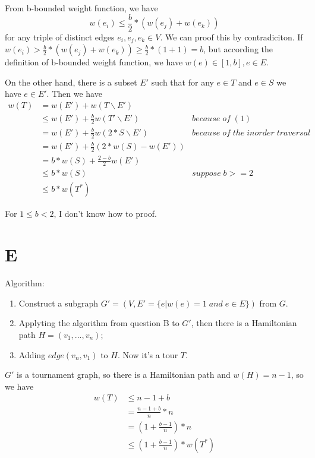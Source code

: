\documentclass{article}
\begin{document}
From b-bounded weight function, we have
\begin{equation}
  w(e_i) \le \frac{b}{2} * (w(e_j) + w(e_k))
\end{equation}
for any triple of distinct edges $e_i, e_j, e_k \in V$. We can proof this by contradiciton. If $w(e_i) > \frac{b}{2} * (w(e_j) + w(e_k)) \ge \frac{b}{2} * (1+1) = b$, but according the definition of b-bounded weight function, we have $w(e) \in [1,b], e \in E$.

On the other hand, there is a subset $E'$ such that for any $e \in T$ and $e \in S$ we have $e \in E'$. Then we have
\begin{equation*}
\begin{aligned}
  w(T) &=   w(E') + w(T \backslash E') \\
       &\le w(E') + \frac{b}{2}w(T' \backslash E')    & because \; of \; (1) \\
       &= w(E') + \frac{b}{2}w(2 * S \backslash E') & because \; of \; the \; inorder \; traversal \\
       &= w(E') + \frac{b}{2}(2 * w(S) - w(E')) \\
       &= b * w(S) + \frac{2-b}{2}w(E') \\
       &\le b * w(S) & suppose \; b>=2 \\
       &\le b * w(T^*)
\end{aligned}
\end{equation*}

For $1 \le b<2$, I don't know how to proof.

\section*{E}
Algorithm:
\begin{enumerate}
  \item Construct a subgraph $G'=(V,E'=\{e | w(e)=1 \; and \; e \in E\})$ from $G$.
  \item Applyting the algorithm from question B to $G'$, then there is a Hamiltonian path $H=(v_1,...,v_n)$;
  \item Adding $edge(v_n, v_1)$ to $H$. Now it's a tour $T$.
\end{enumerate}

$G'$ is a tournament graph, so there is a Hamiltonian path and $w(H) = n-1$, so we have
\begin{equation*}
\begin{aligned}
  w(T) &\le n-1+b \\
       &= \frac{n-1+b}{n} * n \\
       &= (1+\frac{b-1}{n}) * n \\
       &\le (1+\frac{b-1}{n}) * w(T^*)
\end{aligned}
\end{equation*}
\end{document}
